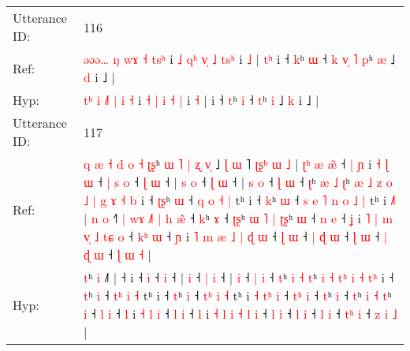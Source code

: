 \documentclass[10pt]{article}
\DeclareRobustCommand{\hl}[1]{{\textcolor{red}{#1}}}
\begin{document}
\begin{longtable}{ll}
\midrule
Utterance ID: & 116 \\
Ref: & \hl{ə}\hl{ə}\hl{ə}\hl{…} \hl{ŋ} \hl{w}\hl{ɤ} \hl{˧} \hl{t}\hl{s}\hl{ʰ} i \hl{˩} \hl{q}\hl{ʰ} \hl{v}\hl{̩} \hl{˩} \hl{t}\hl{s}\hl{ʰ} i \hl{˩} |\hl{ }\hl{t}\hl{ʰ} i ˧ \hl{k}ʰ \hl{ɯ} ˧\hl{ }\hl{k}\hl{ }\hl{v}\hl{̩}\hl{ }\hl{˥} \hl{p}ʰ \hl{æ} ˩ \hl{d} i ˩ |
 \\
Hyp: & \hl{}\hl{}\hl{t}\hl{ʰ} \hl{i} \hl{˩}\hl{˥} \hl{|} \hl{i}\hl{ }\hl{˧} i \hl{˧} \hl{}\hl{|} \hl{}\hl{i} \hl{˧} \hl{}\hl{}\hl{|} i \hl{˧} |\hl{}\hl{}\hl{} i ˧ \hl{t}ʰ \hl{i} ˧\hl{}\hl{}\hl{}\hl{}\hl{}\hl{}\hl{} \hl{t}ʰ \hl{i} ˩ \hl{k} i ˩ |
 \\
\midrule
Utterance ID: & 117 \\
Ref: & \hl{q}\hl{ }\hl{æ}\hl{ }\hl{˧}\hl{ }\hl{d}\hl{ }\hl{o}\hl{ }\hl{˧}\hl{ }\hl{ʈ}\hl{ʂ}ʰ\hl{ }\hl{ɯ}\hl{ }\hl{˥}\hl{ }\hl{|}\hl{ }\hl{ʐ} \hl{v}\hl{̩} ˩\hl{ }\hl{ɭ}\hl{ }\hl{ɯ}\hl{ }˥\hl{ }\hl{ʈ}\hl{ʂ}\hl{ʰ}\hl{ }\hl{ɯ}\hl{ }\hl{˩} |\hl{ }\hl{ʈ}\hl{ʰ}\hl{ }\hl{æ}\hl{ }\hl{æ}\hl{̃} ˧\hl{ }\hl{|}\hl{ }\hl{ɲ} i\hl{ }\hl{˧}\hl{ }\hl{ɭ}\hl{ }\hl{ɯ} ˧\hl{ }\hl{|}\hl{ }\hl{s} \hl{o} ˧\hl{ }\hl{ɭ} \hl{ɯ} ˧ |\hl{ }\hl{s} \hl{o} ˧ \hl{ɭ} \hl{ɯ} ˧ |\hl{ }\hl{s} \hl{o} ˧ \hl{ɭ} \hl{ɯ} ˧ \hl{ʈ}ʰ \hl{æ} \hl{˩} \hl{ʈ}ʰ\hl{ }\hl{æ}\hl{ }\hl{˩} \hl{z} \hl{o} \hl{˩}\hl{ }\hl{|} \hl{g} \hl{ɤ} \hl{˧}\hl{ }\hl{b} i ˧ \hl{ʈ}\hl{ʂ}ʰ \hl{ɯ} ˧ \hl{q}\hl{ }\hl{o} \hl{˧} \hl{|} tʰ i ˧ \hl{k}ʰ \hl{ɯ} ˧\hl{ }\hl{s}\hl{ }\hl{e}\hl{ }\hl{˥} \hl{n}\hl{ }\hl{o} \hl{˩} \hl{|} tʰ i \hl{˩}\hl{˥} \hl{|}\hl{ }\hl{n} \hl{o} ˧\hl{˥}\hl{ }\hl{|}\hl{ }\hl{w}\hl{ɤ}\hl{ }\hl{˩}\hl{˥} \hl{|}\hl{ }\hl{h} \hl{æ}\hl{̃} ˧ \hl{k}ʰ \hl{ɤ} ˧ \hl{ʈ}\hl{ʂ}ʰ\hl{ }\hl{ɯ} \hl{˥} \hl{|} \hl{ʈ}\hl{ʂ}ʰ \hl{ɯ} ˧ \hl{n} \hl{e} ˧ \hl{ʝ} i\hl{ }\hl{˥}\hl{ }\hl{|}\hl{ }\hl{m}\hl{ }\hl{v}\hl{̩} \hl{˩} \hl{t}\hl{ɕ} \hl{o} ˧ \hl{k}\hl{ʰ} \hl{ɯ} ˧ \hl{ɲ} i\hl{ }\hl{˥} \hl{m} \hl{æ} \hl{˩} \hl{|} \hl{ɖ} \hl{ɯ} ˧ \hl{ɭ} \hl{ɯ} ˧\hl{ }\hl{|} \hl{ɖ} \hl{ɯ} ˧ \hl{ɭ} \hl{ɯ} ˧ \hl{|}\hl{ }\hl{ɖ} \hl{ɯ} ˧ \hl{ɭ} \hl{ɯ} \hl{˧} |
 \\
Hyp: & \hl{}\hl{}\hl{}\hl{}\hl{}\hl{}\hl{}\hl{}\hl{}\hl{}\hl{}\hl{}\hl{}\hl{t}ʰ\hl{}\hl{}\hl{}\hl{}\hl{}\hl{}\hl{}\hl{} \hl{}\hl{i} ˩\hl{}\hl{}\hl{}\hl{}\hl{}˥\hl{}\hl{}\hl{}\hl{}\hl{}\hl{}\hl{}\hl{} |\hl{}\hl{}\hl{}\hl{}\hl{}\hl{}\hl{}\hl{} ˧\hl{}\hl{}\hl{}\hl{} i\hl{}\hl{}\hl{}\hl{}\hl{}\hl{} ˧\hl{}\hl{}\hl{}\hl{} \hl{i} ˧\hl{}\hl{} \hl{i} ˧ |\hl{}\hl{} \hl{i} ˧ \hl{|} \hl{i} ˧ |\hl{}\hl{} \hl{i} ˧ \hl{|} \hl{i} ˧ \hl{t}ʰ \hl{i} \hl{˧} \hl{t}ʰ\hl{}\hl{}\hl{}\hl{} \hl{i} \hl{˧} \hl{}\hl{t}\hl{ʰ} \hl{i} \hl{˧} \hl{}\hl{t}\hl{ʰ} i ˧ \hl{}\hl{t}ʰ \hl{i} ˧ \hl{}\hl{t}\hl{ʰ} \hl{i} \hl{˧} tʰ i ˧ \hl{t}ʰ \hl{i} ˧\hl{}\hl{}\hl{}\hl{}\hl{}\hl{} \hl{}\hl{t}\hl{ʰ} \hl{i} \hl{˧} tʰ i \hl{}\hl{˧} \hl{}\hl{t}\hl{ʰ} \hl{i} ˧\hl{}\hl{}\hl{}\hl{}\hl{}\hl{}\hl{}\hl{}\hl{} \hl{}\hl{t}\hl{ʰ} \hl{}\hl{i} ˧ \hl{t}ʰ \hl{i} ˧ \hl{}\hl{t}ʰ\hl{}\hl{} \hl{i} \hl{˧} \hl{}\hl{t}ʰ \hl{i} ˧ \hl{l} \hl{i} ˧ \hl{l} i\hl{}\hl{}\hl{}\hl{}\hl{}\hl{}\hl{}\hl{}\hl{} \hl{˧} \hl{}\hl{l} \hl{i} ˧ \hl{}\hl{l} \hl{i} ˧ \hl{l} i\hl{}\hl{} \hl{˧} \hl{l} \hl{i} \hl{˧} \hl{l} \hl{i} ˧ \hl{l} \hl{i} ˧\hl{}\hl{} \hl{l} \hl{i} ˧ \hl{l} \hl{i} ˧ \hl{}\hl{t}\hl{ʰ} \hl{i} ˧ \hl{z} \hl{i} \hl{˩} |

\end{longtable}
\end{document}
